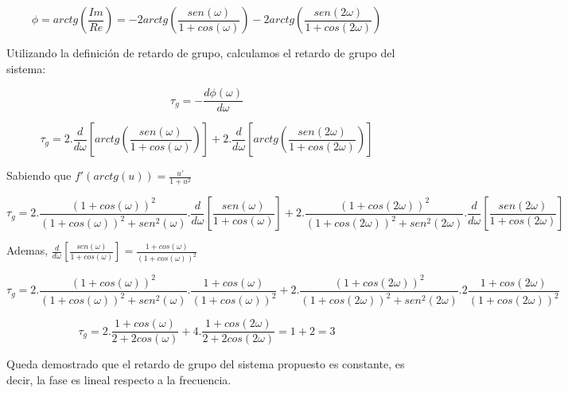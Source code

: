 \documentclass[../../ASSD_TP1_G7.tex]{subfiles}
\begin{document}
\[\phi=arctg\left(\frac{Im}{Re}\right)=-2arctg\left(\frac{sen(\omega)}{1+cos(\omega)}\right)-2arctg\left(\frac{sen(2\omega)}{1+cos(2\omega)}\right)\]

Utilizando la definición de retardo de grupo, calculamos el retardo de grupo del sistema:

$$\tau_g = -\frac{d\phi(\omega)}{d\omega}$$


$$\tau_g =2.\frac{d}{d\omega}\left[arctg\left(\frac{sen(\omega)}{1+cos(\omega)}\right)\right]+2.\frac{d}{d\omega}\left[arctg\left(\frac{sen(2\omega)}{1+cos(2\omega)}\right)\right]$$


Sabiendo que $f'(arctg(u))=\frac{u'}{1+u^2}$

$$\tau_g =2.\frac{(1+cos(\omega))^2}{(1+cos(\omega))^2+sen^2(\omega)}.\frac{d}{d\omega}\left[\frac{sen(\omega)}{1+cos(\omega)}\right]+2.\frac{(1+cos(2\omega))^2}{(1+cos(2\omega))^2+sen^2(2\omega)}.\frac{d}{d\omega}\left[\frac{sen(2\omega)}{1+cos(2\omega)}\right]$$


Ademas, $\frac{d}{d\omega}\left[\frac{sen(\omega)}{1+cos(\omega)}\right]=\frac{1+cos(\omega)}{(1+cos(\omega))^2}$

$$\tau_g =2.\frac{(1+cos(\omega))^2}{(1+cos(\omega))^2+sen^2(\omega)}.\frac{1+cos(\omega)}{(1+cos(\omega))^2}+2.\frac{(1+cos(2\omega))^2}{(1+cos(2\omega))^2+sen^2(2\omega)}.2\frac{1+cos(2\omega)}{(1+cos(2\omega))^2}$$

$$\tau_g =2.\frac{1+cos(\omega)}{2+2cos(\omega)}+4.\frac{1+cos(2\omega)}{2+2cos(2\omega)}=1+2=3$$

Queda demostrado que el retardo de grupo del sistema propuesto es constante, es decir, la fase es lineal respecto a la frecuencia. 
\end{document}
